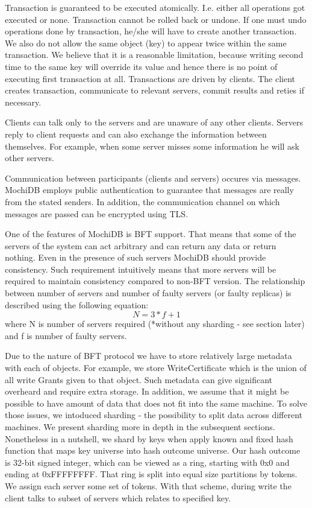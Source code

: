 \documentclass[letterpaper,twocolumn,10pt]{article}
\begin{document}
Transaction is guaranteed to be executed atomically. I.e. either all operations got executed or none. Transaction cannot be rolled back or undone. If one must undo operations done by transaction, he/she will have to create another transaction. We also do not allow the same object (key) to appear twice within the same transaction. We believe that it is a reasonable limitation, because writing second time to the same key will override its value and hence there is no point of executing first transaction at all. Transactions are driven by clients. The client creates transaction, communicate to relevant servers, commit results and reties if necessary.

Clients can talk only to the servers and are unaware of any other clients. Servers reply to client requests and can also exchange the information between themselves. For example, when some server misses some information he will ask other servers.

Communication between participants (clients and servers) occures via messages. MochiDB employs public authentication to guarantee that messages are really from the stated senders. In addition, the communication channel on which messages are passed can be encrypted using TLS.

One of the features of MochiDB is BFT support. That means that some of the servers of the system can act arbitrary and can return any data or return nothing. Even in the presence of such servers MochiDB should provide consistency. Such requirement intuitively means that more servers will be required to maintain consistency compared to non-BFT version. The relationship between number of servers and number of faulty servers (or faulty replicas) is described using the following equation:
\begin{equation}N = 3*f + 1\end{equation}  where N is number of servers required (*without any sharding - see section later) and f is number of faulty servers.

Due to the nature of BFT protocol we have to store relatively large metadata with each of objects. For example, we store WriteCertificate which is the union of all write Grants given to that object. Such metadata can give significant overheard and require extra storage. In addition, we assume that it might be possible to have amount of data that does not fit into the same machine. To solve those issues, we intoduced sharding - the possibility to split data across different machines. We present sharding more in depth in the subsequent sections. Nonetheless in a nutshell, we shard by keys when apply known and fixed hash function that maps key universe into hash outcome universe. Our hash outcome is 32-bit signed integer, which can be viewed as a ring, starting with 0x0 and ending at 0xFFFFFFFF. That ring is split into equal size partitions by tokens. We assign each server some set of tokens. With that scheme, during write the client talks to subset of servers which relates to specified key. 
\end{document}
